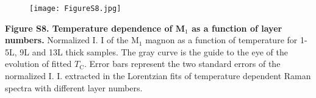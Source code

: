 \documentclass[prl, preprint, superscriptaddress]{revtex4-1}
\begin{document}
\begin{figure}[!h]
\texttt{[image: FigureS8.jpg]}
\end{figure}
\vspace{-5pt}
\begin{footnotesize}
\noindent\textbf{Figure S8. Temperature dependence of $\mathrm{\textbf{M}}_1$ as a function of layer numbers.} Normalized I. I of the $\mathrm{M}_1$ magnon as a function of temperature for 1-5L, 9L and 13L thick samples. The gray curve is the guide to the eye of the evolution of fitted $T_\mathrm{C}$. Error bars represent the two standard errors of the normalized I. I. extracted in the Lorentzian fits of temperature dependent Raman spectra with different layer numbers.  \\
\end{footnotesize}
\end{document}
